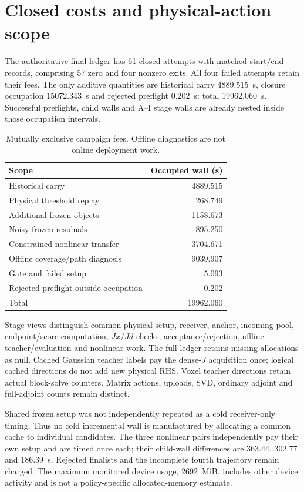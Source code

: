 \section{Closed costs and physical-action scope}
The authoritative final ledger has 61 closed attempts with matched start/end records, comprising 57 zero and four nonzero exits. All four failed attempts retain their fees. The only additive quantities are historical carry 4889.515~s, closure occupation 15072.343~s and rejected preflight 0.202~s: total 19962.060~s. Successful preflights, child walls and A--I stage walls are already nested inside those occupation intervals.
\begin{table}[htbp]\centering\small
\caption{Mutually exclusive campaign fees. Offline diagnostics are not online deployment work.}\label{tab:closed-cost}
\begin{tabular}{lr}\toprule
Scope&Occupied wall (s)\\\midrule
Historical carry&4889.515\\
Physical threshold replay&268.749\\
Additional frozen objects&1158.673\\
Noisy frozen residuals&895.250\\
Constrained nonlinear transfer&3704.671\\
Offline coverage/path diagnosis&9039.907\\
Gate and failed setup&5.093\\
Rejected preflight outside occupation&0.202\\\midrule
Total&19962.060\\\bottomrule
\end{tabular}\end{table}

Stage views distinguish common physical setup, receiver, anchor, incoming pool, endpoint/score computation, $Jx/Jd$ checks, acceptance/rejection, offline teacher/evaluation and nonlinear work. The full ledger retains missing allocations as null. Cached Gaussian teacher labels pay the dense-$J$ acquisition once; logical cached directions do not add new physical RHS. Voxel teacher directions retain actual block-solve counters. Matrix actions, uploads, SVD, ordinary adjoint and full-adjoint counts remain distinct.

Shared frozen setup was not independently repeated as a cold receiver-only timing. Thus no cold incremental wall is manufactured by allocating a common cache to individual candidates. The three nonlinear pairs independently pay their own setup and are timed once each; their child-wall differences are 363.44, 302.77 and 186.39~s. Rejected finalists and the incomplete fourth trajectory remain charged. The maximum monitored device usage, 2692~MiB, includes other device activity and is not a policy-specific allocated-memory estimate.

